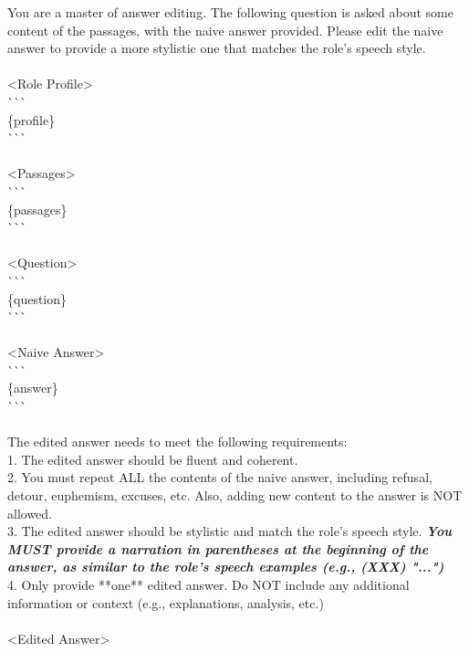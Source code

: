 \begin{figure*}
\begin{tcolorbox}[
    colback=gray!10,      %
    colframe=gray!80,     %
    title=Prompt for stylizing naive answer to create On-scene Dialogues ({\color{yellow}{randomly add narration}}),
    fonttitle=\bfseries,  %
    rounded corners,
    boxrule=0.5mm,        %
    width=\linewidth
]
\scriptsize

You are a master of answer editing. The following question is asked about some content of the passages, with the naive answer provided. Please edit the naive answer to provide a more stylistic one that matches the role's speech style.\\
\\
<Role Profile>\\
\`{}\`{}\`{}\\
\{profile\}\\
\`{}\`{}\`{}\\
\\
<Passages>\\
\`{}\`{}\`{}\\
\{passages\}\\
\`{}\`{}\`{}\\
\\
<Question>\\
\`{}\`{}\`{}\\
\{question\}\\
\`{}\`{}\`{}\\
\\
<Naive Answer>\\
\`{}\`{}\`{}\\
\{answer\}\\
\`{}\`{}\`{}\\
\\
The edited answer needs to meet the following requirements:\\
1. The edited answer should be fluent and coherent.\\
2. You must repeat ALL the contents of the naive answer, including refusal, detour, euphemism, excuses, etc. Also, adding new content to the answer is NOT allowed.\\
3. The edited answer should be stylistic and match the role's speech style. \textbf{\textit{You MUST provide a narration in parentheses at the beginning of the answer, as similar to the role's speech examples (e.g., (XXX) "...")}}\\
4. Only provide **one** edited answer. Do NOT include any additional information or context (e.g., explanations, analysis, etc.)\\
\\
<Edited Answer>


\end{tcolorbox}
\end{figure*}
